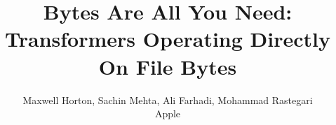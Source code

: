\documentclass[10pt,twocolumn,letterpaper]{article}
\begin{document}
\title{Bytes Are All You Need: Transformers Operating Directly On File Bytes}

\author{Maxwell Horton, Sachin Mehta, Ali Farhadi, Mohammad Rastegari \\
Apple \\
}

\maketitle
\ificcvfinal\thispagestyle{empty}\fi

\begin{abstract}

\end{abstract}


{\small


}


\end{document}
